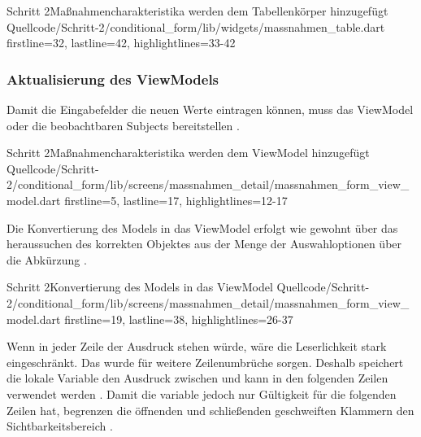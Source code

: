 \begin{alexlisting}{Schritt 2}{Maßnahmencharakteristika werden dem Tabellenkörper hinzugefügt}
  {Quellcode/Schritt-2/conditional_form/lib/widgets/massnahmen_table.dart}
  {firstline=32, lastline=42, highlightlines={33-42}}
  \label{lst:Schritt2MassnahmencharakteristikaWerdenDemTabellenkoerperHinzugefuegt}
\end{alexlisting}

\subsubsection{Aktualisierung des ViewModels}

Damit die Eingabefelder die neuen Werte eintragen können, muss das ViewModel oder die beobachtbaren Subjects bereitstellen .  

\begin{alexlisting}{Schritt 2}{Maßnahmencharakteristika werden dem ViewModel hinzugefügt}
  {Quellcode/Schritt-2/conditional_form/lib/screens/massnahmen_detail/massnahmen_form_view_model.dart}
  {firstline=5, lastline=17, highlightlines={12-17}}
  \label{lst:Schritt2MassnahmencharakteristikaWerdenDemViewModelHinzugefuegt}
\end{alexlisting}


Die Konvertierung des Models in das ViewModel erfolgt wie gewohnt über das heraussuchen des korrekten Objektes aus der Menge der Auswahloptionen über die Abkürzung . 

\begin{alexlisting}{Schritt 2}{Konvertierung des Models in das ViewModel}
  {Quellcode/Schritt-2/conditional_form/lib/screens/massnahmen_detail/massnahmen_form_view_model.dart}
  {firstline=19, lastline=38, highlightlines={26-37}}
  \label{lst:Schritt2KonvertierungDesModelsInDasViewModel}
\end{alexlisting}

Wenn in jeder Zeile der Ausdruck  stehen würde, wäre die Leserlichkeit stark eingeschränkt. Das wurde für weitere Zeilenumbrüche sorgen. Deshalb speichert die lokale Variable  den Ausdruck zwischen und kann in den folgenden Zeilen verwendet werden .
Damit die variable  jedoch nur Gültigkeit für die folgenden Zeilen hat, begrenzen die öffnenden und schließenden geschweiften Klammern den Sichtbarkeitsbereich .

